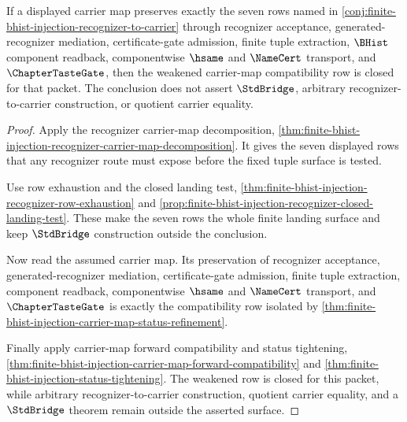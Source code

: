 \begin{theorem}
\label{thm:finite-bhist-injection-carrier-map-positive-criterion}
If a displayed carrier map preserves exactly the seven rows named in \autoref{conj:finite-bhist-injection-recognizer-to-carrier} through recognizer acceptance, generated-recognizer mediation, certificate-gate admission, finite tuple extraction, $\BHist$ component readback, componentwise $\hsame$ and $\NameCert$ transport, and $\ChapterTasteGate$, then the weakened carrier-map compatibility row is closed for that packet. The conclusion does not assert $\StdBridge$, arbitrary recognizer-to-carrier construction, or quotient carrier equality.
\end{theorem}
\begin{proof}
Apply the recognizer carrier-map decomposition, \autoref{thm:finite-bhist-injection-recognizer-carrier-map-decomposition}. It gives the seven displayed rows that any recognizer route must expose before the fixed tuple surface is tested.

Use row exhaustion and the closed landing test, \autoref{thm:finite-bhist-injection-recognizer-row-exhaustion} and \autoref{prop:finite-bhist-injection-recognizer-closed-landing-test}. These make the seven rows the whole finite landing surface and keep $\StdBridge$ construction outside the conclusion.

Now read the assumed carrier map. Its preservation of recognizer acceptance, generated-recognizer mediation, certificate-gate admission, finite tuple extraction, component readback, componentwise $\hsame$ and $\NameCert$ transport, and $\ChapterTasteGate$ is exactly the compatibility row isolated by \autoref{thm:finite-bhist-injection-carrier-map-status-refinement}.

Finally apply carrier-map forward compatibility and status tightening, \autoref{thm:finite-bhist-injection-carrier-map-forward-compatibility} and \autoref{thm:finite-bhist-injection-status-tightening}. The weakened row is closed for this packet, while arbitrary recognizer-to-carrier construction, quotient carrier equality, and a $\StdBridge$ theorem remain outside the asserted surface.
\end{proof}


